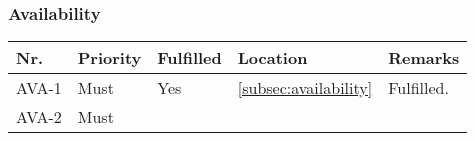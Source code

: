 	\subsubsection{Availability}
	\begin{table}[H]
	\begin{tabular}{lllll}
	
	Nr.   & Priority & Fulfilled & Location & Remarks \\ \hline
	
	AVA-1 & Must     & Yes        & \ref{subsec:availability}         & Fulfilled.       \\ 
	
	AVA-2 & Must     & ~        & ~         & ~       \\
	
	\end{tabular}
	\end{table}
	
